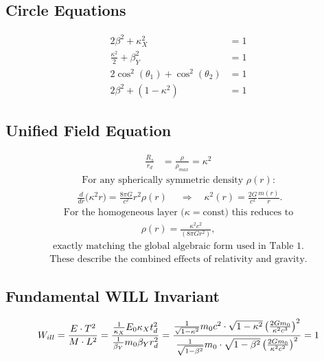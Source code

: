 \documentclass[12pt, a4paper]{article}
\begin{document}
\subsection{Circle Equations}

\begin{align}
    2\beta^2 + \kappa_X^2 &= 1 \\
    \frac{\kappa^2}{2} + \beta_Y^2 &= 1 \\
    2\cos^2(\theta_1) + \cos^2(\theta_2) &= 1 \\
    2\beta^2 + (1-\kappa^2) &= 1
\end{align}

\subsection{Unified Field Equation}

\begin{align}
    \frac{R_s}{r_{d}} &= \frac{\rho}{\rho_{max}} = \kappa^2
\end{align}
\begin{align}
\text{For any spherically symmetric density $\rho(r)$:}
\end{align}
\begin{align}
\boxed{\;
   \frac{d}{dr}\bigl(\kappa^{2}r\bigr)
   =\frac{8\pi G}{c^{2}} r^{2}\rho(r)
\;}
\quad\Longrightarrow\quad
\kappa^{2}(r)=\frac{2G}{c^{2}}\frac{m(r)}{r}.
\end{align}
\begin{align}
\text{For the homogeneous layer ($\kappa=\text{const}$) this reduces to}
\end{align}
\begin{align}
\rho(r)=\frac{\kappa^{2}c^{2}}{(8\pi G r^{2})},
\end{align}
\begin{align}
\text{exactly matching the global algebraic form used in Table 1.}
\end{align}
\begin{align}
\text{These describe the combined effects of relativity and gravity.}
\end{align}

\subsection{Fundamental WILL Invariant}



\[
W_{ill} = \frac{E \cdot T^2}{M \cdot L^2} = \frac{\frac{1}{\kappa_{X}} E_0 \kappa_{X} t^2_{d}}{\frac{1}{\beta_{Y}} m_0\beta_{Y} r^2_{d}} = \frac{\frac{1}{\sqrt{1-\kappa^{2}}}m_{0}c^{2}\cdot\sqrt{1-\kappa^{2}}\left(\frac{2Gm_{0}}{\kappa^{2}c^{3}}\right)^{2}}{\frac{1}{\sqrt{1-\beta^{2}}}m_{0}\cdot\sqrt{1-\beta^{2}}\left(\frac{2Gm_{0}}{\kappa^{2}c^{2}}\right)^{2}}=1 \\
\]
\end{document}

